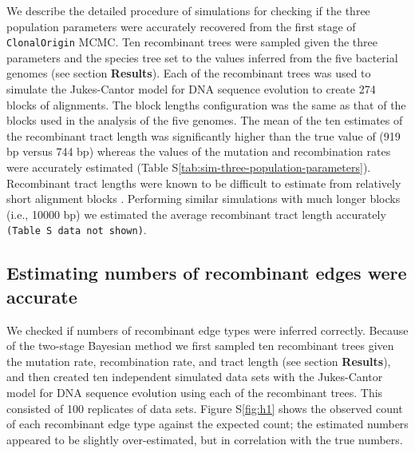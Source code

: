 \documentclass[english]{article}
\begin{document}
We describe the detailed procedure of simulations for checking if the three
population parameters were accurately recovered from the first stage of
\texttt{ClonalOrigin} MCMC.  Ten recombinant trees were sampled given the three
parameters and the species tree  set to the values inferred from the five
bacterial genomes (see section \textbf{Results}).  Each of the recombinant trees
was used to simulate the Jukes-Cantor model for DNA sequence evolution to create
274 blocks of alignments.  The block lengths configuration was the same as that
of the blocks used in the analysis of the five genomes.  The mean of the ten
estimates of the recombinant tract length was significantly higher than the true
value of (919 bp versus 744 bp) whereas the values of the mutation and
recombination rates were accurately estimated (Table
S\ref{tab:sim-three-population-parameters}).  Recombinant tract lengths were
known to be difficult to estimate from relatively short alignment blocks
\citep{Didelot2010}. Performing similar simulations with much longer blocks
(i.e., 10000 bp) we estimated the average recombinant tract length accurately
\texttt{(Table S data not shown)}.

\subsection{Estimating numbers of recombinant edges were accurate}

We checked if numbers of recombinant edge types were inferred correctly. Because
of the two-stage Bayesian method we first sampled ten recombinant trees given
the mutation rate, recombination rate, and tract length (see section
\textbf{Results}), and then created ten independent simulated data sets with the
Jukes-Cantor model for DNA sequence evolution using each of the recombinant
trees. This consisted of 100 replicates of data sets.  Figure S\ref{fig:h1}
shows the observed count of each recombinant edge type against the expected
count; the estimated numbers appeared to be slightly over-estimated, but in
correlation with the true numbers.
\end{document}
